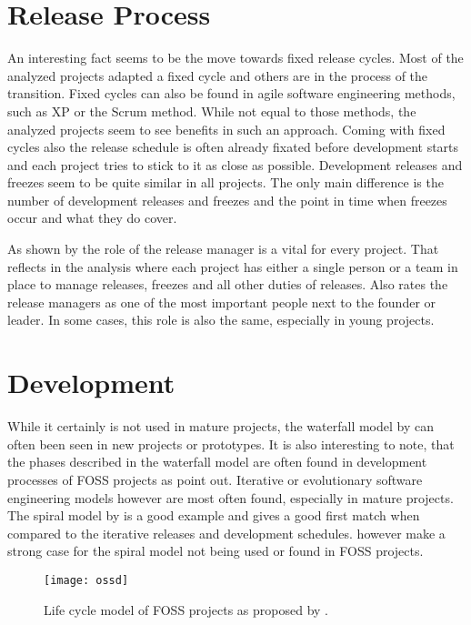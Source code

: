 
\section{Release Process} %

An interesting fact seems to be the move towards fixed release cycles. Most of
the analyzed projects adapted a fixed cycle and others are in the process of
the transition. Fixed cycles can also be found in agile software engineering
methods, such as \acl{XP} or the Scrum method. While not equal to those
methods, the analyzed projects seem to see benefits in such an approach. Coming
with fixed cycles also the release schedule is often already fixated before
development starts and each project tries to stick to it as close as possible.
Development releases and freezes seem to be quite similar in all projects. The
only main difference is the number of development releases and freezes and the
point in time when freezes occur and what they do cover.

As shown by \textcite{Mockus2002} the role of the release manager is a vital
for every project. That reflects in the analysis where each project has either
a single person or a team in place to manage releases, freezes and all other
duties of releases. Also \textcite{Crowston2005} rates the release managers as
one of the most important people next to the founder or leader. In some cases,
this role is also the same, especially in young projects.


\section{Development} %

While it certainly is not used in mature projects, the waterfall model by
\textcite{Royce1970} can often been seen in new projects or prototypes. It is
also interesting to note, that the phases described in the waterfall model are
often found in development processes of \ac{FOSS} projects as
\textcite{Roets2007} point out. Iterative or evolutionary software engineering
models however are most often found, especially in mature projects. The spiral
model by \textcite{Boehm1988} is a good example and gives a good first match
when compared to the iterative releases and development schedules.
\textcite{Roets2007} however make a strong case for the spiral model not being
used or found in \ac{FOSS} projects.

\begin{figure}[htbp]
  \centering
  \texttt{[image: ossd]}
  \caption[Life cycle model of \acl{FOSS} projects]
  {Life cycle model of \acl{FOSS} projects as proposed by \textcite{Roets2007}.}
\end{figure}

